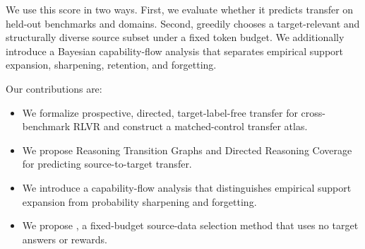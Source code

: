 We use this score in two ways.  First, we evaluate whether it predicts transfer
on held-out benchmarks and domains.  Second, \drcselect greedily chooses a
target-relevant and structurally diverse source subset under a fixed token
budget.  We additionally introduce a Bayesian capability-flow analysis that
separates empirical support expansion, sharpening, retention, and forgetting.

Our contributions are:
\begin{itemize}
    \item We formalize prospective, directed, target-label-free transfer for
    cross-benchmark RLVR and construct a matched-control transfer atlas.
    \item We propose Reasoning Transition Graphs and Directed Reasoning
    Coverage for predicting source-to-target transfer.
    \item We introduce a capability-flow analysis that distinguishes empirical
    support expansion from probability sharpening and forgetting.
    \item We propose \drcselect, a fixed-budget source-data selection method
    that uses no target answers or rewards.
\end{itemize}

